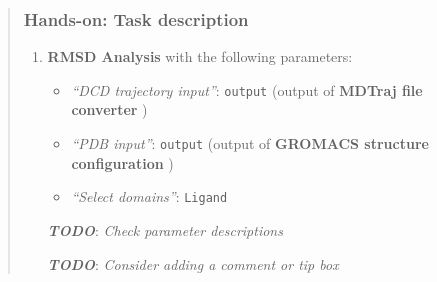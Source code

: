 \documentclass[twocolumn]{bmcart}%
\providecommand{\tightlist}{%
  \setlength{\itemsep}{0pt}\setlength{\parskip}{0pt}}
\providecommand{\tightlist}{%
  \setlength{\itemsep}{0pt}\setlength{\parskip}{0pt}}
\begin{document}
\begin{quote}
\hypertarget{hands-on-task-description-10}{%
\subsubsection{Hands-on: Task
description}\label{hands-on-task-description-10}}

\begin{enumerate}
\def\labelenumi{\arabic{enumi}.}
\tightlist
\item
  \textbf{RMSD Analysis} with the following parameters:

  \begin{itemize}
  \tightlist
  \item
    \emph{``DCD trajectory input''}: \texttt{output} (output of
    \textbf{MDTraj file converter} )
  \item
    \emph{``PDB input''}: \texttt{output} (output of \textbf{GROMACS
    structure configuration} )
  \item
    \emph{``Select domains''}: \texttt{Ligand}
  \end{itemize}

  \textbf{\emph{TODO}}: \emph{Check parameter descriptions}

  \textbf{\emph{TODO}}: \emph{Consider adding a comment or tip box}
\end{enumerate}


\end{quote}
\end{document}
